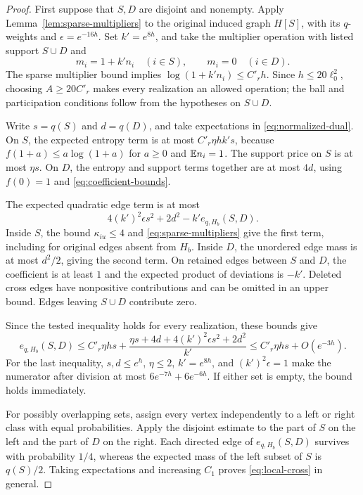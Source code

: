 \begin{proof}
First suppose that $S,D$ are disjoint and nonempty.  Apply
Lemma~\ref{lem:sparse-multipliers} to the original induced graph
$H[S]$, with its $q$-weights and $\epsilon=e^{-16h}$.  Set
$k'=e^{8h}$, and take the multiplier operation with listed support
$S\cup D$ and
\[
 m_i=1+k'n_i\quad(i\in S),\qquad m_i=0\quad(i\in D).
\]
The sparse multiplier bound implies
$\log(1+k'n_i)\le C'_r h$.  Since $h\le20\ell_0^2$, choosing
$A\ge20C'_r$ makes every realization an allowed operation; the ball
and participation conditions follow from the hypotheses on $S\cup D$.

Write $s=q(S)$ and $d=q(D)$, and take expectations in
\eqref{eq:normalized-dual}.  On $S$, the expected entropy term is at
most $C'_r\eta hk's$, because $f(1+a)\le a\log(1+a)$ for $a\ge0$
and $\mathbb E n_i=1$.  The support price on $S$ is at most $\eta s$.
On $D$, the entropy and support terms together are at most $4d$,
using $f(0)=1$ and \eqref{eq:coefficient-bounds}.

The expected quadratic edge term is at most
\begin{equation}
\label{eq:cross-quadratic-cost}
 4(k')^2\epsilon s^2+2d^2-k'e_{q,H_b}(S,D).
\end{equation}
Inside $S$, the bound $\kappa_{iu}\le4$ and
\eqref{eq:sparse-multipliers} give the first term, including for
original edges absent from $H_b$.  Inside $D$, the unordered edge mass
is at most $d^2/2$, giving the second term.  On retained edges between
$S$ and $D$, the coefficient is at least $1$ and the expected product
of deviations is $-k'$.  Deleted cross edges have nonpositive
contributions and can be omitted in an upper bound.  Edges leaving
$S\cup D$ contribute zero.

Since the tested inequality holds for every realization, these bounds
give
\[
 e_{q,H_b}(S,D)
 \le C'_r\eta hs+
       \frac{\eta s+4d+4(k')^2\epsilon s^2+2d^2}{k'}
 \le C'_r\eta hs+O(e^{-3h}).
\]
For the last inequality, $s,d\le e^h$, $\eta\le2$,
$k'=e^{8h}$, and $(k')^2\epsilon=1$ make the numerator after
division at most $6e^{-7h}+6e^{-6h}$.  If either set is empty, the
bound holds immediately.

For possibly overlapping sets, assign every vertex independently to a
left or right class with equal probabilities.  Apply the disjoint
estimate to the part of $S$ on the left and the part of $D$ on the
right.  Each directed edge of $e_{q,H_b}(S,D)$ survives with
probability $1/4$, whereas the expected mass of the left subset of
$S$ is $q(S)/2$.  Taking expectations and increasing $C_1$ proves
\eqref{eq:local-cross} in general.
\end{proof}

